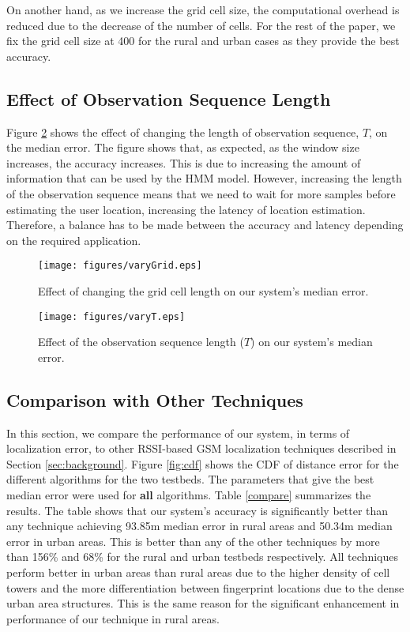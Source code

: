 \documentclass[conference]{IEEEtran}
\begin{document}
On another hand, as we increase the grid cell size, the
computational overhead is reduced due to the decrease of the number
of cells. For the rest of the paper, we fix the grid cell size at
400 for the rural and urban cases as they provide the best accuracy.

\subsection{Effect of Observation Sequence Length}
Figure \ref{fig:grid_W} shows the effect of changing the length of
observation sequence, $T$, on the median error. The figure shows
that, as expected, as the window size increases, the accuracy
increases. This is due to increasing the amount of information that
can be used by the HMM model. However, increasing the length of the
observation sequence means that we need to wait for more samples
before estimating the user location, increasing the latency of
location estimation. Therefore, a balance has to be made between the
accuracy and latency depending on the required application.




\begin{figure}[!t]
    \centering
\texttt{[image: figures/varyGrid.eps]}
            \caption{Effect of changing the grid cell length on our system's median error.}
    \label{fig:grid_cell}
\end{figure}

 \begin{figure}[!t]
    \centering
\texttt{[image: figures/varyT.eps]}
            \caption{Effect of the observation sequence length ($T$) on our system's median error.}
    \label{fig:grid_W}
\end{figure}






\subsection{Comparison with Other Techniques}
In this section, we compare the performance of our system, in terms
of localization error, to other RSSI-based GSM localization
techniques described in Section \ref{sec:background}. Figure
\ref{fig:cdf} shows the CDF of distance error for the different
algorithms for the two testbeds. The parameters that give the best
median error were used for \textbf{all} algorithms. Table
\ref{compare} summarizes the results. The table shows that our
system's accuracy is significantly better than any technique
achieving 93.85m median error in rural areas and 50.34m median error
in urban areas. This is better than any of the other techniques by
more than 156\% and 68\% for the rural and urban testbeds
respectively. All techniques perform better in urban areas than
rural areas due to the higher density of cell towers and the more
differentiation between fingerprint locations due to the dense urban
area structures. This is the same reason for the significant
enhancement in performance of our technique in rural areas.
\end{document}
